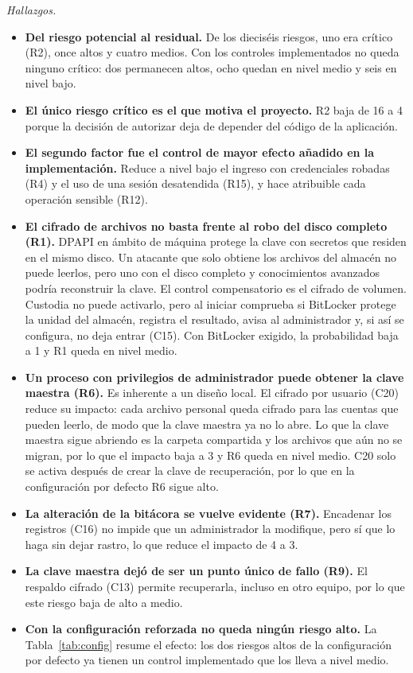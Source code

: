 \documentclass[conference]{IEEEtran}
\begin{document}
\textit{Hallazgos.}
\begin{itemize}
    \item \textbf{Del riesgo potencial al residual.} De los dieciséis riesgos, uno era crítico (R2), once altos y cuatro medios. Con los controles implementados no queda ninguno crítico: dos permanecen altos, ocho quedan en nivel medio y seis en nivel bajo.
    \item \textbf{El único riesgo crítico es el que motiva el proyecto.} R2 baja de 16 a 4 porque la decisión de autorizar deja de depender del código de la aplicación.
    \item \textbf{El segundo factor fue el control de mayor efecto añadido en la implementación.} Reduce a nivel bajo el ingreso con credenciales robadas (R4) y el uso de una sesión desatendida (R15), y hace atribuible cada operación sensible (R12).
    \item \textbf{El cifrado de archivos no basta frente al robo del disco completo (R1).} DPAPI en ámbito de máquina protege la clave con secretos que residen en el mismo disco. Un atacante que solo obtiene los archivos del almacén no puede leerlos, pero uno con el disco completo y conocimientos avanzados podría reconstruir la clave. El control compensatorio es el cifrado de volumen. Custodia no puede activarlo, pero al iniciar comprueba si BitLocker protege la unidad del almacén, registra el resultado, avisa al administrador y, si así se configura, no deja entrar (C15). Con BitLocker exigido, la probabilidad baja a 1 y R1 queda en nivel medio.
    \item \textbf{Un proceso con privilegios de administrador puede obtener la clave maestra (R6).} Es inherente a un diseño local. El cifrado por usuario (C20) reduce su impacto: cada archivo personal queda cifrado para las cuentas que pueden leerlo, de modo que la clave maestra ya no lo abre. Lo que la clave maestra sigue abriendo es la carpeta compartida y los archivos que aún no se migran, por lo que el impacto baja a 3 y R6 queda en nivel medio. C20 solo se activa después de crear la clave de recuperación, por lo que en la configuración por defecto R6 sigue alto.
    \item \textbf{La alteración de la bitácora se vuelve evidente (R7).} Encadenar los registros (C16) no impide que un administrador la modifique, pero sí que lo haga sin dejar rastro, lo que reduce el impacto de 4 a 3.
    \item \textbf{La clave maestra dejó de ser un punto único de fallo (R9).} El respaldo cifrado (C13) permite recuperarla, incluso en otro equipo, por lo que este riesgo baja de alto a medio.
    \item \textbf{Con la configuración reforzada no queda ningún riesgo alto.} La Tabla~\ref{tab:config} resume el efecto: los dos riesgos altos de la configuración por defecto ya tienen un control implementado que los lleva a nivel medio.
\end{itemize}
\end{document}
